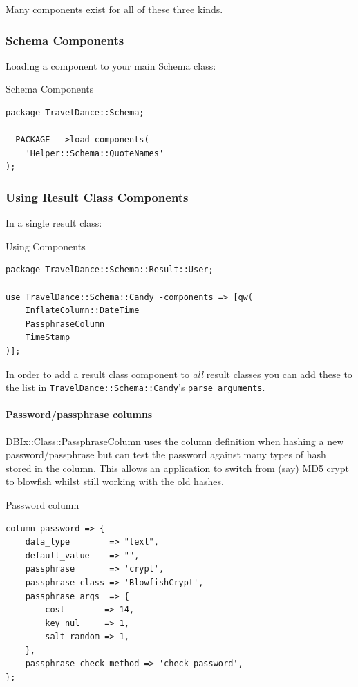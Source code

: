 Many components exist for all of these three kinds.

\subsubsection{Schema Components}

Loading a component to your main Schema class:

\begin{frame}[fragile]{Schema Components}
\begin{lstlisting}
package TravelDance::Schema;
 
__PACKAGE__->load_components(
    'Helper::Schema::QuoteNames'
);
\end{lstlisting}
\end{frame}

\subsubsection{Using Result Class Components}

In a single result class:

\begin{frame}[fragile]{Using Components}
\begin{lstlisting}
package TravelDance::Schema::Result::User;

use TravelDance::Schema::Candy -components => [qw(
    InflateColumn::DateTime 
    PassphraseColumn
    TimeStamp
)];
\end{lstlisting}
\end{frame}

In order to add a result class component to \emph{all} result classes you
can add these to the list 
in \verb|TravelDance::Schema::Candy|'s \verb|parse_arguments|.

\paragraph{Password/passphrase columns}

DBIx::Class::PassphraseColumn uses the column definition when hashing a new
password/passphrase but can test the password against many types of hash
stored in the column. This allows an application to switch from (say)
MD5 crypt to blowfish whilst still working with the old hashes.

\begin{frame}[fragile]{Password column}
\begin{lstlisting}
column password => {
    data_type        => "text",
    default_value    => "",
    passphrase       => 'crypt',
    passphrase_class => 'BlowfishCrypt',
    passphrase_args  => {
        cost        => 14,
        key_nul     => 1,
        salt_random => 1,
    },
    passphrase_check_method => 'check_password',
};
\end{lstlisting}
\end{frame}

